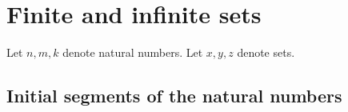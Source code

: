 \documentclass[../../set-theory.tex]{subfiles}
\begin{document}
  \section{Finite and infinite sets}

  \begin{forthel}
  \end{forthel}

  \begin{forthel}
  \end{forthel}

  \begin{forthel}
    Let $n, m, k$ denote natural numbers.
    Let $x, y, z$ denote sets.
  \end{forthel}


  \subsection{Initial segments of the natural numbers}
\end{document}
